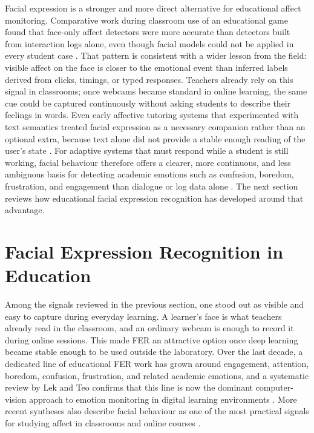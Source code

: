 Facial expression is a stronger and more direct alternative for educational affect monitoring. Comparative work during classroom use of an educational game found that face-only affect detectors were more accurate than detectors built from interaction logs alone, even though facial models could not be applied in every student case \cite{bosch_2015}. That pattern is consistent with a wider lesson from the field: visible affect on the face is closer to the emotional event than inferred labels derived from clicks, timings, or typed responses. Teachers already rely on this signal in classrooms; once webcams became standard in online learning, the same cue could be captured continuously without asking students to describe their feelings in words. Even early affective tutoring systems that experimented with text semantics treated facial expression as a necessary companion rather than an optional extra, because text alone did not provide a stable enough reading of the user's state \cite{lin_employing_2012}. For adaptive systems that must respond while a student is still working, facial behaviour therefore offers a clearer, more continuous, and less ambiguous basis for detecting academic emotions such as confusion, boredom, frustration, and engagement than dialogue or log data alone \cite{lek_academic_2023,vistorte_integrating_2024,petrovica_emotion_2016}. The next section reviews how educational facial expression recognition has developed around that advantage.

\section{Facial Expression Recognition in Education}\label{sec:fer_in_education}

Among the signals reviewed in the previous section, one stood out as visible and easy to capture during everyday learning. A learner's face is what teachers already read in the classroom, and an ordinary webcam is enough to record it during online sessions. This made \ac{FER} an attractive option once deep learning became stable enough to be used outside the laboratory. Over the last decade, a dedicated line of educational \ac{FER} work has grown around engagement, attention, boredom, confusion, frustration, and related academic emotions, and a systematic review by Lek and Teo confirms that this line is now the dominant computer-vision approach to emotion monitoring in digital learning environments \cite{lek_academic_2023}. More recent syntheses also describe facial behaviour as one of the most practical signals for studying affect in classrooms and online courses \cite{vistorte_integrating_2024,florestiyanto_emotion_2024}.

